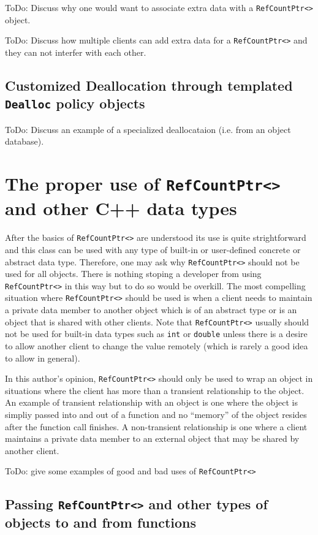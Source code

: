 ToDo: Discuss why one would want to associate extra data with a \texttt{RefCountPtr<>}
object.

ToDo: Discuss how multiple clients can add extra data for a \texttt{RefCountPtr<>}
and they can not interfer with each other.

%
\subsection{Customized Deallocation through templated \texttt{Dealloc} policy objects}
%

ToDo: Discuss an example of a specialized deallocataion (i.e. from an
object database).

%
\section{The proper use of \texttt{RefCountPtr<>} and other C++ data types}
%

After the basics of \texttt{RefCountPtr<>} are understood its use is
quite strightforward and this class can be used with any type of
built-in or user-defined concrete or abstract data type.  Therefore,
one may ask why \texttt{RefCountPtr<>} should not be used for all
objects.  There is nothing stoping a developer from using
\texttt{RefCountPtr<>} in this way but to do so would be overkill.
The most compelling situation where \texttt{RefCountPtr<>} should be
used is when a client needs to maintain a private data member to
another object which is of an abstract type or is an object that is
shared with other clients.  Note that \texttt{RefCountPtr<>} usually
should not be used for built-in data types such as \texttt{int} or
\texttt{double} unless there is a desire to allow another client to
change the value remotely (which is rarely a good idea to allow in
general).

In this author's opinion, \texttt{RefCountPtr<>} should only be used
to wrap an object in situations where the client has more than a
transient relationship to the object.  An example of transient
relationship with an object is one where the object is simpliy passed
into and out of a function and no ``memory'' of the object resides
after the function call finishes.  A non-transient relationship is one
where a client maintains a private data member to an external object
that may be shared by another client.

ToDo: give some examples of good and bad uses of \texttt{RefCountPtr<>}

%
\subsection{Passing \texttt{RefCountPtr<>} and other types of objects to and from functions}
%

